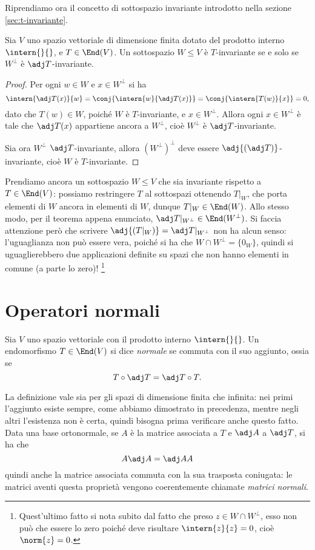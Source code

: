 Riprendiamo ora il concetto di sottospazio invariante introdotto nella sezione \ref{sec:t-invariante}.
\begin{teorema} \label{t:invariante-ortogonale}
	Sia $V$ uno spazio vettoriale di dimensione finita dotato del prodotto interno $\intern{}{}$, e $T\in\End(V)$.
	Un sottospazio $W\leq V$ è $T$-invariante se e solo se $W^\perp$ è $\adj T$-invariante.
\end{teorema}
\begin{proof}
	Per ogni $  w\in W$ e $  x\in W^\perp$ si ha
	\begin{equation}
		\intern{\adj T(  x)}{  w}=\conj{\intern{  w}{\adj T(  x)}}=\conj{\intern{T(  w)}{  x}}=0,
	\end{equation}
	dato che $T(  w)\in W$, poich\'e $W$ è $T$-invariante, e $  x\in W^\perp$.
	Allora ogni $  x\in W^\perp$ è tale che $\adj T(  x)$ appartiene ancora a $W^\perp$, cioè $W^\perp$ è $\adj T$-invariante.

	Sia ora $W^\perp$ $\adj T$-invariante, allora $(W^\perp)^\perp$ deve essere $\adj{(\adj T)}$-invariante, cioè $W$ è $T$-invariante.
\end{proof}
Prendiamo ancora un sottospazio $W\leq V$ che sia invariante rispetto a $T\in\End(V)$: possiamo restringere $T$ al sottospazi ottenendo $T|_W$, che porta elementi di $W$ ancora in elementi di $W$, dunque $T|_W\in\End(W)$.
Allo stesso modo, per il teorema appena enunciato, $\adj T|_{W^\perp}\in\End(W^\perp)$.
Si faccia attenzione però che scrivere $\adj{(T|_W)}=\adj T|_{W^\perp}$ non ha alcun senso: l'uguaglianza non può essere vera, poich\'e si ha che $W\cap W^\perp=\{0_W\}$, quindi si uguaglierebbero due applicazioni definite su spazi che non hanno elementi in comune (a parte lo zero)!
\footnote{Quest'ultimo fatto si nota subito dal fatto che preso $  z\in W\cap W^\perp$, esso non può che essere lo zero poich\'e deve risultare $\intern{  z}{  z}=0$, cioè $\norm{  z}=0$.}

\section{Operatori normali}
\begin{definizione} \label{d:operatore-normale}
	Sia $V$ uno spazio vettoriale con il prodotto interno $\intern{}{}$.
	Un endomorfismo $T\in\End(V)$ si dice \emph{normale} se commuta con il suo aggiunto, ossia se
	\begin{equation*}
		T\circ\adj T=\adj T\circ T.
	\end{equation*}
\end{definizione}
La definizione vale sia per gli spazi di dimensione finita che infinita: nei primi l'aggiunto esiste sempre, come abbiamo dimostrato in precedenza, mentre negli altri l'esistenza non è certa, quindi bisogna prima verificare anche questo fatto.
Data una base ortonormale, se $A$ è la matrice associata a $T$ e $\adj A$ a $\adj T$, si ha che
\begin{equation*}
	A\adj A=\adj AA
\end{equation*}
quindi anche la matrice associata commuta con la sua trasposta coniugata: le matrici aventi questa proprietà vengono coerentemente chiamate \emph{matrici normali}.

